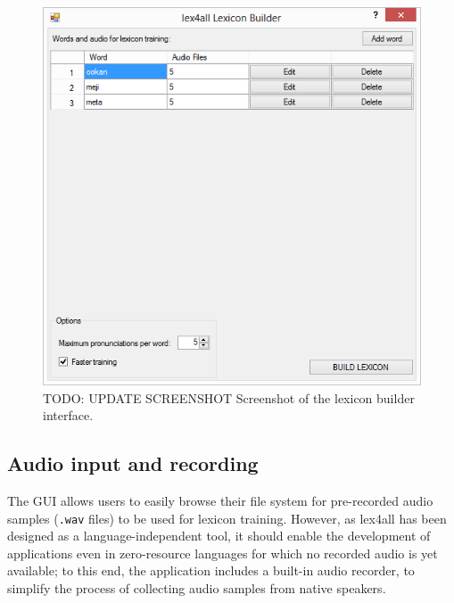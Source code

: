 \documentclass[11pt]{article}
\begin{document}
\begin{figure}[tb]
\begin{center}
\includegraphics[width=\columnwidth]{../screenshots/LexiconBuilder-Main-Filled.PNG}
\caption{TODO: UPDATE SCREENSHOT Screenshot of the lexicon builder interface.\label{fig:mainform}}
\end{center}
\end{figure}

\subsection{Audio input and recording}
\label{sec:recording}


The GUI allows users to easily browse their file system for pre-recorded audio samples (\texttt{.wav} files) to be used for lexicon training. However, as lex4all has been designed as a language-independent tool, it should enable the development of applications even in zero-resource languages for which no recorded audio is yet available; to this end, the application includes a built-in audio recorder, to simplify the process of collecting audio samples from native speakers.
\end{document}
